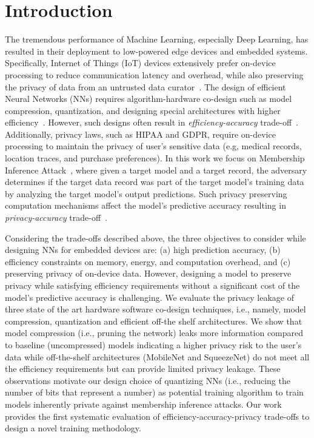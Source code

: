 \section{Introduction}

The tremendous performance of Machine Learning, especially Deep Learning, has resulted in their deployment to low-powered edge devices and embedded systems.
Specifically, Internet of Things (IoT) devices extensively prefer on-device processing to reduce communication latency and overhead, while also preserving the privacy of data from an untrusted data curator~\cite{8110880}.
The design of efficient Neural Networks (NNs) requires algorithm-hardware co-design such as model compression, quantization, and designing special architectures with higher efficiency~\cite{8114708}.
However, such designs often result in \textit{efficiency-accuracy} trade-off~\cite{rastegari2016xnornet}.
Additionally, privacy laws, such as HIPAA and GDPR, require on-device processing to maintain the privacy of user's sensitive data (e.g, medical records, location traces, and purchase preferences).
In this work we focus on Membership Inference Attack~\cite{shokri2017membership}, where given a target model and a target record, the adversary determines if the target data record was part of the target model's training data by analyzing the target model's output predictions.
Such privacy preserving computation mechanisms affect the model's predictive accuracy resulting in \textit{privacy-accuracy} trade-off~\cite{Abadi:2016:DLD:2976749.2978318,DBLP:conf/ccs/NasrSH18}.

Considering the trade-offs described above, the three objectives to consider while designing NNs for embedded devices are: (a) high prediction accuracy, (b) efficiency constraints on memory, energy, and computation overhead, and (c) preserving privacy of on-device data.
However, designing a model to preserve privacy while satisfying efficiency requirements without a significant cost of the model’s predictive accuracy is challenging.
We evaluate the privacy leakage of three state of the art hardware software co-design techniques, i.e., namely, model compression, quantization and efficient off-the shelf architectures.
We show that model compression (i.e., pruning the network) leaks more information compared to baseline (uncompressed) models indicating a higher privacy risk to the user’s data while off-the-shelf architectures (MobileNet and SqueezeNet) do not meet all the efficiency requirements but can provide limited privacy leakage.
These observations motivate our design choice of quantizing NNs (i.e., reducing the number of bits that represent a number) as potential training algorithm to train models inherently private against membership inference attacks.
Our work provides the first systematic evaluation of efficiency-accuracy-privacy trade-offs to design a novel training methodology.
